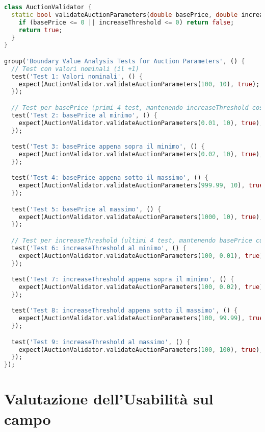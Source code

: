 \begin{lstlisting}[language=Dart]
class AuctionValidator {
  static bool validateAuctionParameters(double basePrice, double increaseThreshold) {
    if (basePrice <= 0 || increaseThreshold <= 0) return false;
    return true;
  }
}

group('Boundary Value Analysis Tests for Auction Parameters', () {
  // Test con valori nominali (il +1)
  test('Test 1: Valori nominali', () {
    expect(AuctionValidator.validateAuctionParameters(100, 10), true);
  });

  // Test per basePrice (primi 4 test, mantenendo increaseThreshold costante)
  test('Test 2: basePrice al minimo', () {
    expect(AuctionValidator.validateAuctionParameters(0.01, 10), true);
  });

  test('Test 3: basePrice appena sopra il minimo', () {
    expect(AuctionValidator.validateAuctionParameters(0.02, 10), true);
  });

  test('Test 4: basePrice appena sotto il massimo', () {
    expect(AuctionValidator.validateAuctionParameters(999.99, 10), true);
  });

  test('Test 5: basePrice al massimo', () {
    expect(AuctionValidator.validateAuctionParameters(1000, 10), true);
  });

  // Test per increaseThreshold (ultimi 4 test, mantenendo basePrice costante)
  test('Test 6: increaseThreshold al minimo', () {
    expect(AuctionValidator.validateAuctionParameters(100, 0.01), true);
  });

  test('Test 7: increaseThreshold appena sopra il minimo', () {
    expect(AuctionValidator.validateAuctionParameters(100, 0.02), true);
  });

  test('Test 8: increaseThreshold appena sotto il massimo', () {
    expect(AuctionValidator.validateAuctionParameters(100, 99.99), true);
  });

  test('Test 9: increaseThreshold al massimo', () {
    expect(AuctionValidator.validateAuctionParameters(100, 100), true);
  });
});
    \end{lstlisting}


\section{Valutazione dell'Usabilità sul campo}